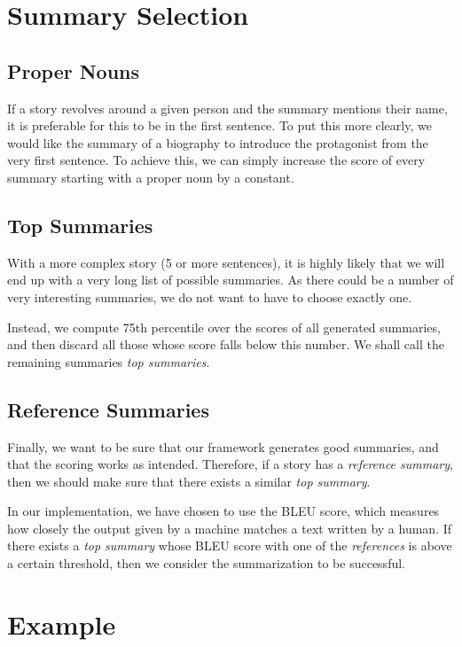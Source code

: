 \section{Summary Selection}

\subsection{Proper Nouns}

If a story revolves around a given person and the summary mentions their name, it is preferable for this to be in the first sentence. To put this more clearly, we would like the summary of a biography to introduce the protagonist from the very first sentence. To achieve this, we can simply increase the score of every summary starting with a proper noun by a constant.

\subsection{Top Summaries}

With a more complex story (5 or more sentences), it is highly likely that we will end up with a very long list of possible summaries. As there could be a number of very interesting summaries, we do not want to have to choose exactly one.

Instead, we compute 75th percentile over the scores of all generated summaries, and then discard all those whose score falls below this number. We shall call the remaining summaries \textit{top summaries}.

\subsection{Reference Summaries}

Finally, we want to be sure that our framework generates good summaries, and that the scoring works as intended. Therefore, if a story has a \textit{reference summary}, then we should make sure that there exists a similar \textit{top summary}.

In our implementation, we have chosen to use the BLEU score, which measures how closely the output given by a machine matches a text written by a human. If there exists a \textit{top summary} whose BLEU score with one of the \textit{references} is above a certain threshold, then we consider the summarization to be successful.

\section{Example}
\label{sec:postprocess_example}

